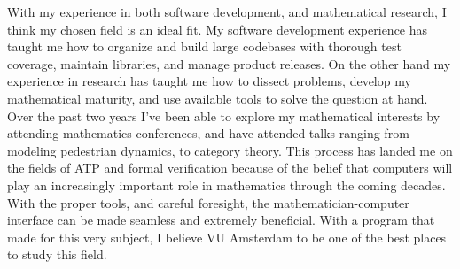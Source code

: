 \documentclass[11pt]{article}
\begin{document}
With my experience in both software development, and mathematical research, I think my chosen field is an ideal fit. My software development experience has taught me how to organize and build large codebases with thorough test coverage, maintain libraries, and manage product releases. On the other hand my experience in research has taught me how to dissect problems, develop my mathematical maturity, and use available tools to solve the question at hand. Over the past two years I've been able to explore my mathematical interests by attending mathematics conferences, and have attended talks ranging from modeling pedestrian dynamics, to category theory. This process has landed me on the fields of ATP and formal verification because of the belief that computers will play an increasingly important role in mathematics through the coming decades. With the proper tools, and careful foresight, the mathematician-computer interface can be made seamless and extremely beneficial. With a program that made for this very subject, I believe VU Amsterdam to be one of the best places to study this field.
\end{document}
